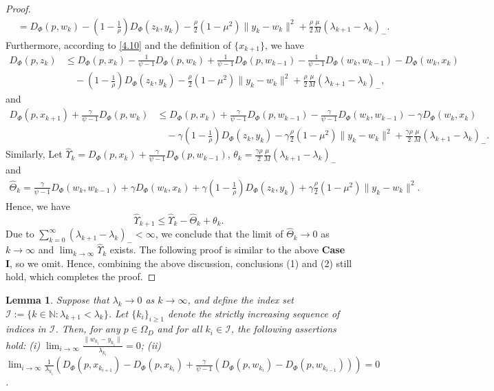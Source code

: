 \documentclass[hidelinks,11 pt]{article}
\numberwithin{equation}{section}
\newtheorem{lemma}[theorem]{Lemma}
\theoremstyle{definition}  %
\numberwithin{equation}{section}
\numberwithin{theorem}{section}
\begin{document}
\begin{proof}
\begin{align*}
         &= D_{\Phi}(p, w_k)-(1-\frac{1}{\rho})D_{\Phi}(z_k, y_k)-\frac{\rho}{2}(1-\mu^2)\|y_{k}-w_{k}\|^2 +\frac{\rho}{2}\frac{\mu}{M}(\lambda_{k+1}-\lambda_{k})_{-}\tag{4.15}\label{4.15}.
\end{align*}
Furthermore, according to \eqref{4.10} and the definition of $\{x_{k+1}\}$, we have 
\begin{align*}
    D_{\Phi}(p,z_{k})&\leq D_{\Phi}(p,x_{k})-\frac{1}{\psi-1}D_{\Phi}(p, w_k)+\frac{1}{\psi-1}D_{\Phi}(p, w_{k-1})-\frac{1}{\psi-1}D_{\Phi}(w_k, w_{k-1})-D_{\Phi}(w_{k},x_{k})\\
    &\quad -(1-\frac{1}{\rho})D_{\Phi}(z_k, y_k)-\frac{\rho}{2}(1-\mu^2)\|y_{k}-w_{k}\|^2 +\frac{\rho}{2}\frac{\mu}{M}(\lambda_{k+1}-\lambda_{k})_{-}, 
\end{align*}
and 
\begin{align*}
    D_{\Phi}(p,x_{k+1})+\frac{\gamma}{\psi-1}D_{\Phi}(p,w_{k})&\leq  D_{\Phi}(p,x_{k})+\frac{\gamma}{\psi-1}D_{\Phi}(p,w_{k-1})-\frac{\gamma}{\psi-1}D_{\Phi}(w_{k},w_{k-1})-\gamma D_{\Phi}(w_{k},x_{k})\\
    &\quad -\gamma(1-\frac{1}{\rho})D_{\Phi}(z_k, y_k)-\gamma\frac{\rho}{2}(1-\mu^2)\|y_{k}-w_{k}\|^2 +\frac{\gamma \rho}{2}\frac{\mu}{M}(\lambda_{k+1}-\lambda_{k})_{-}.\tag{4.16}\label{4.16} 
\end{align*}
Similarly, Let $\hat{\Upsilon}_{k} = D_{\Phi}(p,x_{k})+\frac{\gamma}{\psi-1}D_{\Phi}(p,w_{k-1})$, $\theta_{k} = \frac{\gamma \rho}{2}\frac{\mu}{M}(\lambda_{k+1}-\lambda_{k})_{-}$ and 
\begin{align*}
    \hat{\Theta}_{k} = \frac{\gamma}{\psi-1}D_{\Phi}(w_{k},w_{k-1})+\gamma D_{\Phi}(w_{k},x_{k})+\gamma(1-\frac{1}{\rho})D_{\Phi}(z_k, y_k)+\gamma\frac{\rho}{2}(1-\mu^2)\|y_{k}-w_{k}\|^2.
\end{align*}
Hence, we have 
\begin{equation*}
    \hat{\Upsilon}_{k+1}\leq \hat{\Upsilon}_{k}-\hat{\Theta}_{k}+\theta_{k}. 
\end{equation*}
Due to $\sum_{k=0}^\infty (\lambda_{k+1} - \lambda_k)_-<\infty$, we conclude that the limit of $\hat{\Theta}_{k}\to 0$ as $k\to\infty$ and $\lim_{k\to\infty}\hat{\Upsilon}_{k}$ exists.
The following proof is similar to the above \textbf{Case I}, so we omit.
\vskip 2mm 
Hence, combining the above discussion, conclusions (1) and (2) still hold, which completes the proof. 
\end{proof}
\begin{lemma}\label{l4.3}
    Suppose that $\lambda_k \to 0$ as $k \to \infty$, and define the index set $\mathcal{I} := \{k \in \mathbb{N} : \lambda_{k+1} < \lambda_k\}$. Let $\{k_i\}_{i \geq 1}$ denote the strictly increasing sequence of indices in $\mathcal{I}$. Then, for any $p \in \Omega_D$ and for all $k_i \in \mathcal{I}$, the following assertions hold:
    \vskip 2mm 
    (i) $\displaystyle\lim_{i \to \infty} \frac{\|w_{k_i} - y_{k_i}\|}{\lambda_{k_i}} = 0$;
    \vskip 2mm 
    (ii) $\displaystyle\lim_{i \to \infty} \frac{1}{\lambda_{k_i}} \left( D_{\Phi}(p, x_{k_{i+1}}) - D_{\Phi}(p, x_{k_i}) + \frac{\gamma}{\psi - 1} \left( D_{\Phi}(p, w_{k_i}) - D_{\Phi}(p, w_{k_{i-1}}) \right) \right) = 0$.
\end{lemma}
\end{document}
